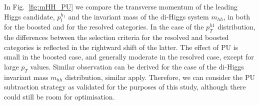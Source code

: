 In Fig.~\ref{fig:mHH_PU}
we compare the transverse momentum of the leading Higgs
candidate, $p_t^{h_1}$ and the invariant mass of the di-Higgs system
$m_{hh}$, in both for the boosted and
for the resolved categories.
%
In the case of the $p_T^{h1}$ distribution, the differences between the selection
criteria for the resolved
and boosted categories is reflected in the rightward shift of the latter.
%
The effect of PU is small in the boosted case, and generally moderate
in the resolved case, except for large $p_T$ values.
%
Similar observation can be derived for the case of
the di-Higgs invariant mass $m_{hh}$ distribution, similar 
apply.
%
Therefore, we can consider the PU subtraction strategy
as validated for the purposes of this study, although
there could still be room for optimisation.


